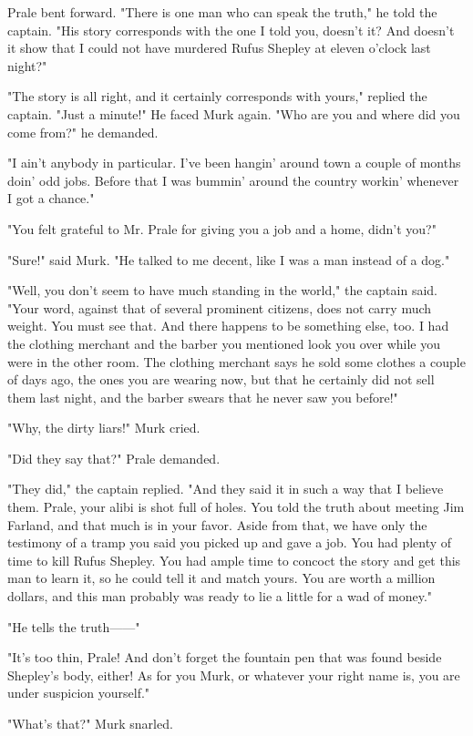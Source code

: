 \documentclass{novel}
\begin{document}
Prale bent forward. "There is one man who can speak the truth," he told the captain. "His story corresponds with the one I told you, doesn't it? And doesn't it show that I could not have murdered Rufus Shepley at eleven o'clock last night?"

"The story is all right, and it certainly corresponds with yours," replied the captain. "Just a minute!" He faced Murk again. "Who are you and where did you come from?" he demanded.

"I ain't anybody in particular. I've been hangin' around town a couple of months doin' odd jobs. Before that I was bummin' around the country workin' whenever I got a chance."

"You felt grateful to Mr. Prale for giving you a job and a home, didn't you?"

"Sure!" said Murk. "He talked to me decent, like I was a man instead of a dog."

"Well, you don't seem to have much standing in the world," the captain said. "Your word, against that of several prominent citizens, does not carry much weight. You must see that. And there happens to be something else, too. I had the clothing merchant and the barber you mentioned look you over while you were in the other room. The clothing merchant says he sold some clothes a couple of days ago, the ones you are wearing now, but that he certainly did not sell them last night, and the barber swears that he never saw you before!"

"Why, the dirty liars!" Murk cried.

"Did they say that?" Prale demanded.

"They did," the captain replied. "And they said it in such a way that I believe them. Prale, your alibi is shot full of holes. You told the truth about meeting Jim Farland, and that much is in your favor. Aside from that, we have only the testimony of a tramp you said you picked up and gave a job. You had plenty of time to kill Rufus Shepley. You had ample time to concoct the story and get this man to learn it, so he could tell it and match yours. You are worth a million dollars, and this man probably was ready to lie a little for a wad of money."

"He tells the truth------"

"It's too thin, Prale! And don't forget the fountain pen that was found beside Shepley's body, either! As for you Murk, or whatever your right name is, you are under suspicion yourself."

"What's that?" Murk snarled.
\end{document}
